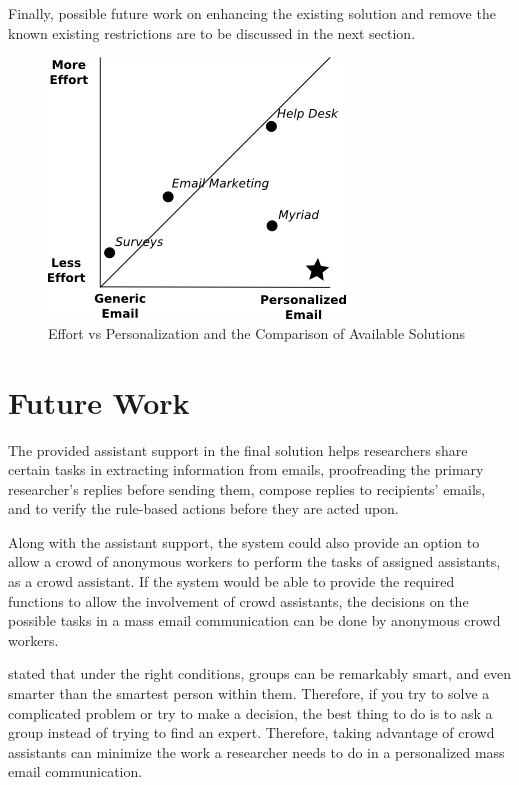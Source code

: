 Finally, possible future work on enhancing the existing solution and remove the known existing restrictions are to be discussed in the next section.

\begin{figure}[htbp]
	\centering
	\includegraphics[width=.55\textwidth]{imgs/drawingEfforPersonalizationAnnotations.png}
	\caption[Effort vs Personalization and the Comparison of Available Solutions]{Effort vs Personalization and the Comparison of Available Solutions}
	\label{fig:drawingEfforPersonalizationAnnotations}
\end{figure}

\section{Future Work}
\label{sec:6.2:FutuWork}

The provided assistant support in the final solution helps researchers share certain tasks in extracting information from emails, proofreading the primary researcher's replies before sending them, compose replies to recipients' emails, and to verify the rule-based actions before they are acted upon.
\vspace{1cm}

Along with the assistant support, the system could also provide an option to allow a crowd of anonymous workers to perform the tasks of assigned assistants, as a crowd assistant. If the system would be able to provide the required functions to allow the involvement of crowd assistants, the decisions on the possible tasks in a mass email communication can be done by anonymous crowd workers.
\vspace{1cm}

\cite{Surowiecki2005} stated that under the right conditions, groups can be remarkably smart, and even smarter than the smartest person within them. Therefore, if you try to solve a complicated problem or try to make a decision, the best thing to do is to ask a group instead of trying to find an expert. Therefore, taking advantage of crowd assistants can minimize the work a researcher needs to do in a personalized mass email communication.
\vspace{1cm}

